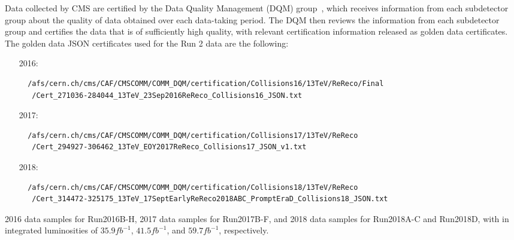 Data collected by CMS are certified by the Data Quality Management (DQM) group~\cite{CMSData}, which receives information from each subdetector group about the quality of data obtained over each data-taking period.
The DQM then reviews the information from each subdetector group and certifies the data that is of sufficiently high quality, with relevant certification information released as golden data certificates.
The golden data JSON certificates used for the Run 2 data are the following: %
\begin{itemize}
  \item[2016:]
  \begingroup
  \fontsize{9pt}{12pt}
  \begin{verbatim}
  /afs/cern.ch/cms/CAF/CMSCOMM/COMM_DQM/certification/Collisions16/13TeV/ReReco/Final
   /Cert_271036-284044_13TeV_23Sep2016ReReco_Collisions16_JSON.txt
  \end{verbatim}
  \endgroup
  \item[2017:]
  \begingroup
  \fontsize{9pt}{12pt}
  \begin{verbatim}
  /afs/cern.ch/cms/CAF/CMSCOMM/COMM_DQM/certification/Collisions17/13TeV/ReReco
   /Cert_294927-306462_13TeV_EOY2017ReReco_Collisions17_JSON_v1.txt
  \end{verbatim}
  \endgroup
  \item[2018:]
  \begingroup
  \fontsize{9pt}{12pt}
  \begin{verbatim}
  /afs/cern.ch/cms/CAF/CMSCOMM/COMM_DQM/certification/Collisions18/13TeV/ReReco
   /Cert_314472-325175_13TeV_17SeptEarlyReReco2018ABC_PromptEraD_Collisions18_JSON.txt
  \end{verbatim}
  \endgroup
\end{itemize}

\begin{table}[htbp]
  \centering
  
  \caption{
    2016 data samples for Run2016B-H, 2017 data samples for Run2017B-F, and 2018 data samples for Run2018A-C and Run2018D, with in integrated luminosities of $35.9\unit{fb^{-1}}$, $41.5\unit{fb^{-1}}$, and $59.7\unit{fb^{-1}}$, respectively.
  }
  \label{tab:dataSamples}
\end{table}

%  

